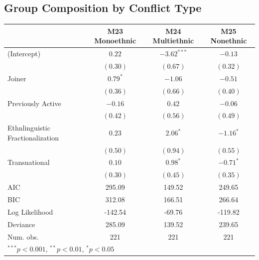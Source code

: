 \documentclass[12pt,]{book}
\let\origtable\table
\let\endorigtable\endtable
\renewenvironment{table}[1][2] {
    \singlespacing
    \expandafter\origtable\expandafter[H]
} {
    \endorigtable
}
\theoremstyle{definition}
\theoremstyle{definition}
\theoremstyle{definition}
\theoremstyle{remark}
\begin{document}
\hypertarget{group-composition-by-conflict-type}{%
\subsection*{Group Composition by Conflict
Type}\label{group-composition-by-conflict-type}}

\begin{table}
\begin{center}
\begin{tabular}{l c c c }
\hline
 & M23 Monoethnic & M24 Multiethnic & M25 Nonethnic \\
\hline
(Intercept)                      & $0.22$     & $-3.62^{***}$ & $-0.13$     \\
                                 & $(0.30)$   & $(0.67)$      & $(0.32)$    \\
Joiner                           & $0.79^{*}$ & $-1.06$       & $-0.51$     \\
                                 & $(0.36)$   & $(0.66)$      & $(0.40)$    \\
Previously Active                & $-0.16$    & $0.42$        & $-0.06$     \\
                                 & $(0.42)$   & $(0.56)$      & $(0.49)$    \\
Ethnlinguistic Fractionalization & $0.23$     & $2.06^{*}$    & $-1.16^{*}$ \\
                                 & $(0.50)$   & $(0.94)$      & $(0.55)$    \\
Transnational                    & $0.10$     & $0.98^{*}$    & $-0.71^{*}$ \\
                                 & $(0.30)$   & $(0.45)$      & $(0.35)$    \\
\hline
AIC                              & 295.09     & 149.52        & 249.65      \\
BIC                              & 312.08     & 166.51        & 266.64      \\
Log Likelihood                   & -142.54    & -69.76        & -119.82     \\
Deviance                         & 285.09     & 139.52        & 239.65      \\
Num. obs.                        & 221        & 221           & 221         \\
\hline
\multicolumn{4}{l}{\scriptsize{$^{***}p<0.001$, $^{**}p<0.01$, $^*p<0.05$}}
\end{tabular}
\caption{Logit Models of Rebel Group Ethnic Composition (Central Govt Conflicts Only)}
\label{tab:comp-govt}
\end{center}
\end{table}
\end{document}
